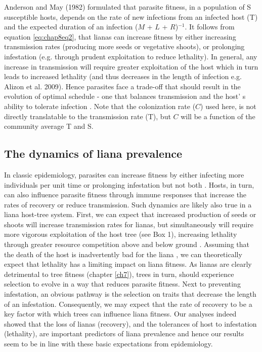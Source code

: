 \documentclass[b5paper,justified]{tufte-book} %
\begin{document}
\begin{fullwidth}
{\begin{minipage}{13.5cm}
\hspace{0.4cm} Anderson and May (1982) formulated that parasite fitness, in a population of S susceptible hosts, depends on the rate of new infections from an infected host (T) and the expected duration of an infection ($M$ + $L$ + $R$)$^{-1}$.   It follows from equation \ref{eq:chap8eq2}, that lianas can increase fitness by either increasing transmission rates (producing more seeds or vegetative shoots), or prolonging infestation (e.g. through prudent exploitation to reduce lethality). In general, any increase in transmission will require greater exploitation of the host which in turn leads to increased lethality (and thus decreases in the length of infection e.g. Alizon et al. 2009). Hence parasites face a trade-off that should result in the evolution of optimal schedule - one that balances transmission and the host' s ability to tolerate infection \citep{Anderson1982, Frank1996}. Note that the colonization rate ($C$) used here, is not directly translatable to the transmission rate (T), but $C$ will be a function of the community average T and S.

\end{minipage}
}

 
\subsection{The dynamics of liana prevalence}
In classic epidemiology, parasites can increase fitness by either infecting more individuals per unit time or prolonging infestation but not both \citep[Box 1;][]{Alizon2009}. Hosts, in turn, can also influence parasite fitness through immune responses that increase the rates of recovery or reduce transmission. Such dynamics are likely also true in a liana host-tree system. First, we can expect that increased production of seeds or shoots will increase transmission rates for lianas, but simultaneously will require more vigorous exploitation of the host tree (see Box 1), increasing lethality through greater resource competition above and below ground \citep{Dillenburg1993, Avalos1999, Schnitzer2005, Alvarez-Cansino2015}. Assuming that the death of the host is inadvertently bad for the liana \citep[due to loss of canopy-access and increased liana mortality;][]{Phillips2005}, we can theoretically expect that lethality has a limiting impact on liana fitness. As lianas are clearly detrimental to tree fitness (chapter \ref{ch7}), trees in turn, should experience selection to evolve in a way that reduces parasite fitness.  Next to preventing infestation, an obvious pathway is the selection on traits that decrease the length of an infestation. Consequently, we may expect that the rate of recovery to be a key factor with which trees can influence liana fitness. Our analyses indeed showed that the loss of lianas (recovery), and the tolerances of host to infestation (lethality), are important predictors of liana prevalence and hence our results seem to be in line with these basic expectations from epidemiology. 


\end{fullwidth}
\end{document}
